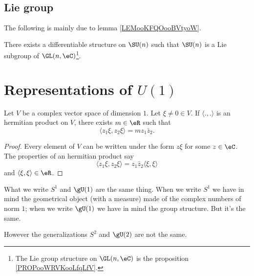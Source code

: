 \subsection{Lie group}

The following is mainly due to lemma \ref{LEMooKFQOooBVtyoW}.
\begin{proposition}     \label{PROPooWMKGooKftzGv}
    There exists a differentiable structure on \( \SU(n)\) such that \( \SU(n)\) is a Lie subgroup of \( \GL(n,\eC)\)\footnote{The Lie group structure on \( \GL(n,\eC)\) is the proposition \ref{PROPooWRVKooLfqLfV}.}.
\end{proposition}


\section{Representations of \texorpdfstring{$ U(1)$}{U(1)}}

\begin{proposition}
    Let \( V\) be a complex vector space of dimension \( 1\). Let \( \xi\neq 0\in V\). If \( \langle ., .\rangle \) is an hermitian product on \( V\), there exists \( m\in \eR\) such that
    \begin{equation}
        \langle z_1\xi, z_2\xi\rangle =mz_1\bar z_2.
    \end{equation}
\end{proposition}

\begin{proof}
    Every element of \( V\) can be written under the form \( z\xi\) for some \( z\in \eC\). The properties of an hermitian product say
    \begin{equation}
        \langle z_1\xi, z_2\xi\rangle =z_1\bar z_2\langle \xi, \xi\rangle 
    \end{equation}
    and \( \langle \xi, \xi\rangle \in \eR\).
\end{proof}

\begin{normaltext}
    What we write \( S^1\) and \( \gU(1)\) are the same thing. When we write \( S^1\) we have in mind the geometrical object (with a measure) made of the complex numbers of norm \( 1\); when we write \( \gU(1)\) we have in mind the group structure. But it's the same.

    However the generalizations \( S^2\) and \( \gU(2)\) are not the same.
\end{normaltext}

